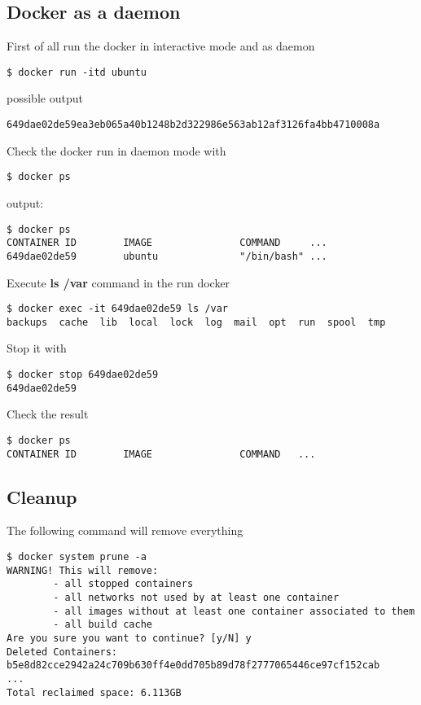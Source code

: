 \documentclass[14pt,a4paper]{article}
\begin{document}
\subsection{Docker as a daemon}
First of all run the docker in interactive mode and as daemon
\begin{verbatim}
$ docker run -itd ubuntu
\end{verbatim}
possible output
\begin{verbatim}
649dae02de59ea3eb065a40b1248b2d322986e563ab12af3126fa4bb4710008a
\end{verbatim}
Check the docker run in daemon mode with
\begin{verbatim}
$ docker ps
\end{verbatim}
output:
\begin{verbatim}
$ docker ps 
CONTAINER ID        IMAGE               COMMAND     ...
649dae02de59        ubuntu              "/bin/bash" ...
\end{verbatim}
Execute \textbf{ls /var} command in the run docker
\begin{verbatim}
$ docker exec -it 649dae02de59 ls /var
backups  cache  lib  local  lock  log  mail  opt  run  spool  tmp
\end{verbatim}
Stop it with
\begin{verbatim}
$ docker stop 649dae02de59
649dae02de59
\end{verbatim}
Check the result
\begin{verbatim}
$ docker ps
CONTAINER ID        IMAGE               COMMAND   ...
\end{verbatim}

\subsection{Cleanup}
The following command will remove everything
\begin{verbatim}
$ docker system prune -a
WARNING! This will remove:
        - all stopped containers
        - all networks not used by at least one container
        - all images without at least one container associated to them
        - all build cache
Are you sure you want to continue? [y/N] y
Deleted Containers:
b5e8d82cce2942a24c709b630ff4e0dd705b89d78f2777065446ce97cf152cab
...
Total reclaimed space: 6.113GB
\end{verbatim}

  
     
\end{document}
